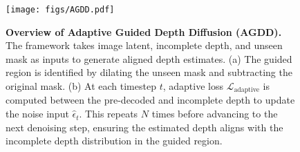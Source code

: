 \begin{figure}[t]
    \centering
    \texttt{[image: figs/AGDD.pdf]}
    \vspace{-6mm}
    \caption{
    \textbf{Overview of Adaptive Guided Depth Diffusion (AGDD).}
    The framework takes image latent, incomplete depth, and unseen mask as inputs to generate aligned depth estimates. (a) The guided region is identified by dilating the unseen mask and subtracting the original mask. (b) At each timestep $t$, adaptive loss $\mathcal{L}_\text{adaptive}$ is computed between the pre-decoded and incomplete depth to update the noise input $\hat{\epsilon}_t$. This repeats $N$ times before advancing to the next denoising step, ensuring the estimated depth aligns with the incomplete depth distribution in the guided region.
    }
    \label{fig:AGDD}
    \vspace{-1mm}
\end{figure}



